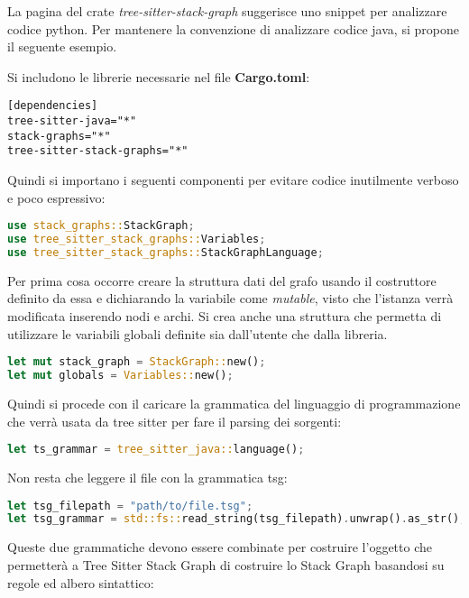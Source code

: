 La pagina del crate \emph{tree-sitter-stack-graph} \cite{TreeSitterStackGraph} suggerisce uno snippet per analizzare codice python.
Per mantenere la convenzione di analizzare codice java, si propone il seguente esempio.

Si includono le librerie necessarie nel file \textbf{Cargo.toml}:

\begin{lstlisting}
[dependencies]
tree-sitter-java="*"
stack-graphs="*"
tree-sitter-stack-graphs="*"
\end{lstlisting}

Quindi si importano i seguenti componenti per evitare codice inutilmente verboso e poco espressivo:
\begin{lstlisting}[language=Rust]
use stack_graphs::StackGraph;
use tree_sitter_stack_graphs::Variables; 
use tree_sitter_stack_graphs::StackGraphLanguage; 
\end{lstlisting}

Per prima cosa occorre creare la struttura dati del grafo usando il costruttore definito da essa e dichiarando la variabile come \emph{mutable}, visto che l'istanza verr\`a modificata inserendo nodi e archi.
Si crea anche una struttura che permetta di utilizzare le variabili globali definite sia dall'utente che dalla libreria.

\begin{lstlisting}[language=Rust]
let mut stack_graph = StackGraph::new();
let mut globals = Variables::new();
\end{lstlisting}

Quindi si procede con il caricare la grammatica del linguaggio di programmazione che verr\`a usata da tree sitter per fare il parsing dei sorgenti:

\begin{lstlisting}[language=Rust]
let ts_grammar = tree_sitter_java::language();
\end{lstlisting}

Non resta che leggere il file con la grammatica tsg:

\begin{lstlisting}[language=Rust]
let tsg_filepath = "path/to/file.tsg";
let tsg_grammar = std::fs::read_string(tsg_filepath).unwrap().as_str();
\end{lstlisting}

Queste due grammatiche devono essere combinate per costruire l'oggetto che permetter\`a a Tree Sitter Stack Graph di costruire lo Stack Graph basandosi su regole ed albero sintattico:

